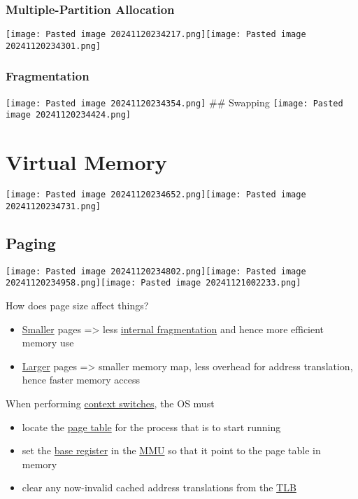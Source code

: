 \subsubsection*{Multiple-Partition Allocation}

\texttt{[image: Pasted image 20241120234217.png]}\texttt{[image: Pasted image 20241120234301.png]}

\subsubsection*{Fragmentation}

\texttt{[image: Pasted image 20241120234354.png]} \#\# Swapping
\texttt{[image: Pasted image 20241120234424.png]}

\section*{Virtual Memory}

\texttt{[image: Pasted image 20241120234652.png]}\texttt{[image: Pasted image 20241120234731.png]}

\subsection*{Paging}

\texttt{[image: Pasted image 20241120234802.png]}\texttt{[image: Pasted image 20241120234958.png]}\texttt{[image: Pasted image 20241121002233.png]}

How does page size affect things?

\begin{itemize}
\tightlist
\item
  \ul{Smaller} pages =\textgreater{} less \ul{internal fragmentation}
  and hence more efficient memory use
\item
  \ul{Larger} pages =\textgreater{} smaller memory map, less overhead
  for address translation, hence faster memory access
\end{itemize}

When performing \ul{context switches}, the OS must

\begin{itemize}
\tightlist
\item
  locate the \ul{page table} for the process that is to start running
\item
  set the \ul{base register} in the \ul{MMU} so that it point to the
  page table in memory
\item
  clear any now-invalid cached address translations from the \ul{TLB}
\end{itemize}


